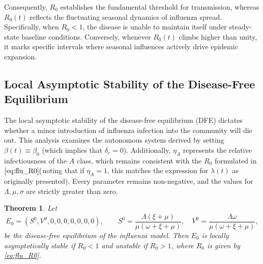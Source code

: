 \documentclass[12pt,a4paper]{article}
\newtheorem{theorem}{Theorem}[section]
\theoremstyle{definition}
\theoremstyle{remark}
\begin{document}
Consequently, $R_0$ establishes the fundamental threshold for transmission, whereas $R_0(t)$ reflects the fluctuating seasonal dynamics of influenza spread. Specifically, when $R_0<1$, the disease is unable to maintain itself under steady-state baseline conditions. Conversely, whenever $R_0(t)$ climbs higher than unity, it marks specific intervals where seasonal influences actively drive epidemic expansion.





\subsection{Local Asymptotic Stability of the Disease-Free Equilibrium}
\label{LAS_flu}

The local asymptotic stability of the disease-free equilibrium (DFE) dictates whether a minor introduction of influenza infection into the community will die out. This analysis examines the autonomous system derived by setting $\beta(t)\equiv\beta_0$ (which implies that $\delta_c=0$). Additionally, $\eta_A$ represents the relative infectiousness of the $A$ class, which remains consistent with the $R_0$ formulated in $\eqref{eq:flu_R0} ($noting that if $\eta_A=1$, this matches the expression for $\lambda(t)$ as originally presented). Every parameter remains non-negative, and the values for $\Lambda,\mu,\sigma$ are strictly greater than zero.



\begin{theorem}\label{thm:LAS_flu}
Let
\[
E_0=(S^0,V^0,0,0,0,0,0,0,0),\qquad
S^0=\frac{\Lambda(\xi+\mu)}{\mu(\omega+\xi+\mu)},\quad
V^0=\frac{\Lambda\omega}{\mu(\omega+\xi+\mu)},
\]
be the disease-free equilibrium of the influenza model. Then $E_0$ is locally
asymptotically stable if $R_0<1$ and unstable if $R_0>1$, where $R_0$ is given
by \eqref{eq:flu_R0}.
\end{theorem}
\end{document}
